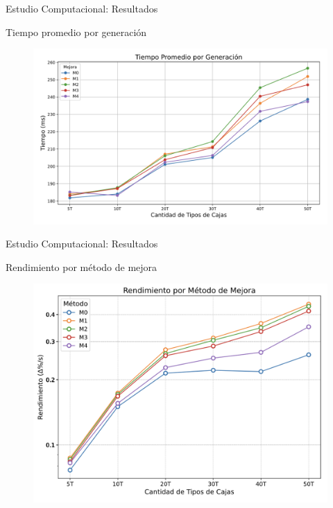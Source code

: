 \documentclass[handout]{beamer}
\begin{document}
\begin{frame}{Estudio Computacional: Resultados}
    \begin{exampleblock}{Tiempo promedio por generación}
        \begin{figure}
            \centering
            \includegraphics[width=0.8\linewidth]{pic/exp-tiempo-por-generacion.png}
        \end{figure}
    \end{exampleblock}
\end{frame}

\begin{frame}{Estudio Computacional: Resultados}
    \begin{exampleblock}{Rendimiento por método de mejora}
        \begin{figure}
            \centering
            \includegraphics[width=0.8\linewidth]{pic/exp-rendimiento.png}
        \end{figure}
    \end{exampleblock}
\end{frame}
\end{document}
